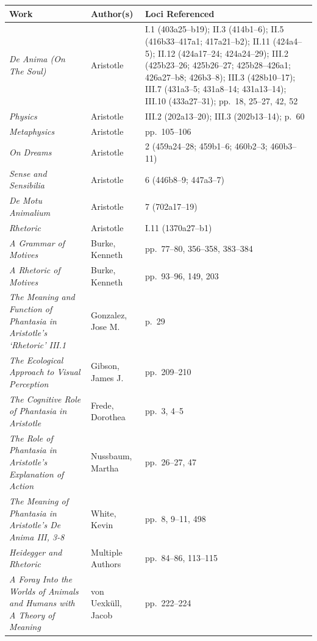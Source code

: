 \documentclass[12pt]{article}
\begin{document}
\begin{center}
\footnotesize
\begin{tabular}{|l|l|l|}
\hline
\textbf{Work} & \textbf{Author(s)} & \textbf{Loci Referenced} \\
\hline
\textit{De Anima (On The Soul)} & Aristotle & I.1 (403a25--b19); II.3 (414b1--6); II.5 (416b33--417a1; 417a21--b2); II.11 (424a4--5); II.12 (424a17--24; 424a24--29); III.2 (425b23--26; 425b26--27; 425b28--426a1; 426a27--b8; 426b3--8); III.3 (428b10--17); III.7 (431a3--5; 431a8--14; 431a13--14); III.10 (433a27--31); pp.~18, 25--27, 42, 52 \\
\hline
\textit{Physics} & Aristotle & III.2 (202a13--20); III.3 (202b13--14); p.~60 \\
\hline
\textit{Metaphysics} & Aristotle & pp.~105--106 \\
\hline
\textit{On Dreams} & Aristotle & 2 (459a24--28; 459b1--6; 460b2--3; 460b3--11) \\
\hline
\textit{Sense and Sensibilia} & Aristotle & 6 (446b8--9; 447a3--7) \\
\hline
\textit{De Motu Animalium} & Aristotle & 7 (702a17--19) \\
\hline
\textit{Rhetoric} & Aristotle & I.11 (1370a27--b1) \\
\hline
\textit{A Grammar of Motives} & Burke, Kenneth & pp.~77--80, 356--358, 383--384 \\
\hline
\textit{A Rhetoric of Motives} & Burke, Kenneth & pp.~93--96, 149, 203 \\
\hline
\textit{The Meaning and Function of Phantasia in Aristotle's `Rhetoric' III.1} & Gonzalez, Jose M. & p.~29 \\
\hline
\textit{The Ecological Approach to Visual Perception} & Gibson, James J. & pp.~209--210 \\
\hline
\textit{The Cognitive Role of Phantasia in Aristotle} & Frede, Dorothea & pp.~3, 4--5 \\
\hline
\textit{The Role of Phantasia in Aristotle's Explanation of Action} & Nussbaum, Martha & pp.~26--27, 47 \\
\hline
\textit{The Meaning of Phantasia in Aristotle's De Anima III, 3-8} & White, Kevin & pp.~8, 9--11, 498 \\
\hline
\textit{Heidegger and Rhetoric} & Multiple Authors & pp.~84--86, 113--115 \\
\hline
\textit{A Foray Into the Worlds of Animals and Humans with A Theory of Meaning} & von Uexküll, Jacob & pp.~222--224 \\
\hline
\end{tabular}
\end{center}
\end{document}
